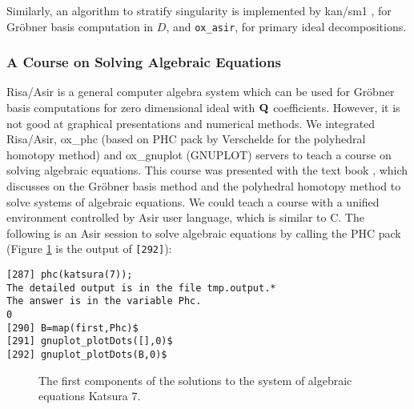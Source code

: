 Similarly, 
an algorithm to stratify singularity 
\cite{oaku-advance}
is implemented by
kan/sm1 \cite{kan}, for Gr\"obner basis computation in $D$, and
{\tt ox\_asir}, for primary ideal decompositions.

\subsubsection{A Course on Solving Algebraic Equations}

Risa/Asir \cite{asir} is a general computer algebra system
which can be used for Gr\"obner basis computations for zero dimensional ideal
with ${\bf Q}$ coefficients.
However, it is not good at graphical presentations and
numerical methods.
We integrated Risa/Asir, ox\_phc (based on PHC pack by Verschelde \cite{phc}
for the polyhedral homotopy method) and
ox\_gnuplot (GNUPLOT) servers
to teach a course on solving algebraic equations.
This course was presented with the text book \cite{CLO},
which discusses 
on the Gr\"obner basis method and the polyhedral homotopy method
to solve systems of algebraic equations.
We could teach a course
with a unified environment
controlled by Asir user language, which is similar to C.
The following is an Asir session to solve algebraic equations by calling
the PHC pack (Figure \ref{katsura} is the output of {\tt [292]}):
\begin{verbatim}
[287] phc(katsura(7));
The detailed output is in the file tmp.output.*
The answer is in the variable Phc.
0
[290] B=map(first,Phc)$
[291] gnuplot_plotDots([],0)$
[292] gnuplot_plotDots(B,0)$
\end{verbatim}

\begin{figure}[htbp]
\epsfxsize=8.5cm
\caption{The first components of the solutions to the system of algebraic equations Katsura 7.}
\label{katsura}
\end{figure}





